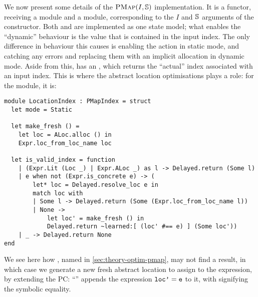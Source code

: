 We now present some details of the $\textsc{PMap}(I,\mathbb S)$ implementation. It is a functor, receiving a  module and a  module, corresponding to the $I$ and $\mathbb S$ arguments of the constructor. Both \PMap{} and \DynPMap{} are implemented as one state model; what enables the ``dynamic'' behaviour is the value  that is contained in the input index. The only difference in behaviour this causes is enabling the \alloc{} action in static mode, and catching any  errors and replacing them with an implicit allocation in dynamic mode. Aside from this,  has an , which returns the ``actual'' index associated with an input index. This is where the abstract location optimisations plays a role: for the  module, it is: \begin{lstlisting}
module LocationIndex : PMapIndex = struct
  let mode = Static

  let make_fresh () =
    let loc = ALoc.alloc () in
    Expr.loc_from_loc_name loc
    
  let is_valid_index = function
    | (Expr.Lit (Loc _) | Expr.ALoc _) as l -> Delayed.return (Some l)
    | e when not (Expr.is_concrete e) -> (
        let* loc = Delayed.resolve_loc e in
        match loc with
        | Some l -> Delayed.return (Some (Expr.loc_from_loc_name l))
        | None ->
            let loc' = make_fresh () in
            Delayed.return ~learned:[ (loc' #== e) ] (Some loc'))
    | _ -> Delayed.return None
end
\end{lstlisting}
We see here how , named  in \cref{sec:theory-optim-pmap}, may not find a result, in which case we generate a new fresh abstract location to assign to the expression, by extending the PC: ``'' appends the expression $\texttt{loc'} = \texttt{e}$ to it, with \code{\#==} signifying the symbolic equality.

